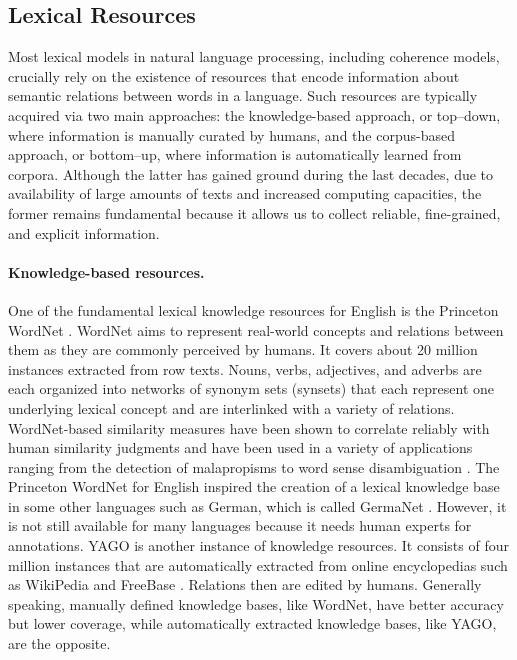 \subsection{Lexical Resources} 

Most lexical models in natural language processing, including coherence models, crucially rely on the existence of resources that encode information about semantic relations between words in a language. 
Such resources are typically acquired via two main approaches: the knowledge-based approach, or top–down, where information is manually curated by humans, and the corpus-based approach, or bottom–up, where information is automatically learned from corpora. 
Although the latter has gained ground during the last decades, due to availability of large amounts of texts and increased computing capacities, the former remains fundamental because it allows us to collect reliable, fine-grained, and explicit information. 

\paragraph{Knowledge-based resources.}
One of the fundamental lexical knowledge resources for English is the Princeton WordNet \cite{fellbaum98}.  
WordNet aims to represent real-world concepts and relations between them as they are commonly perceived by humans. 
It covers about 20 million instances extracted from row texts. 
Nouns, verbs, adjectives, and adverbs are each organized into networks of synonym sets (synsets) that each represent one underlying lexical concept and are interlinked with a variety of relations. 
WordNet-based similarity measures have been shown to correlate reliably with human similarity judgments and have been used in a variety of applications ranging from the detection of malapropisms to word sense disambiguation \cite{budanitsky06}.  
The Princeton WordNet for English inspired the creation of a lexical knowledge base in some other languages such as German, which is called GermaNet \cite{hamp97}. 
However, it is not still available for many languages because it needs human experts for annotations.  
YAGO \cite{hoffart13} is another instance of knowledge resources.  
It consists of four million instances that are automatically extracted from online encyclopedias such as WikiPedia \cite{denoyer06} and FreeBase \cite{bollacker08}. 
Relations then are edited by humans. 
Generally speaking, manually defined knowledge bases, like WordNet, have better accuracy but lower coverage, while automatically extracted knowledge bases, like YAGO, are the opposite. 

